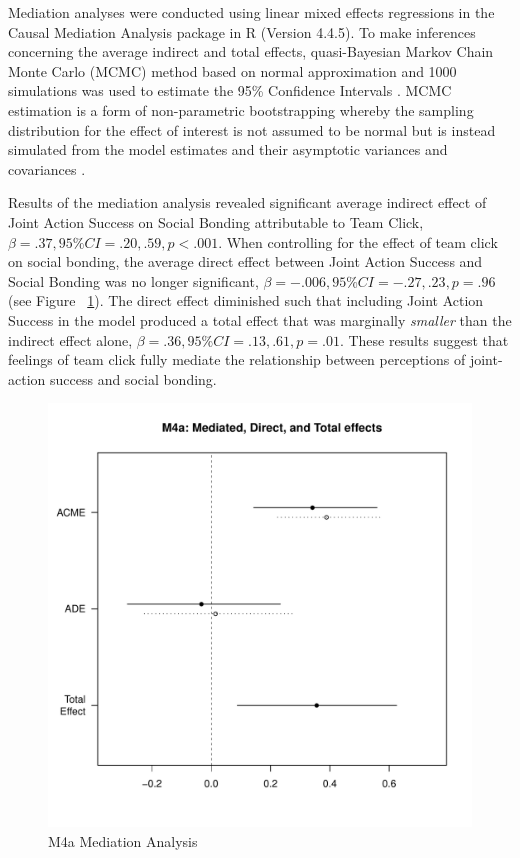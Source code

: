   Mediation analyses were conducted using linear mixed effects regressions in the Causal Mediation Analysis package in R (Version 4.4.5).  To make inferences concerning the average indirect and total effects, quasi-Bayesian Markov Chain Monte Carlo (MCMC) method based on normal approximation and 1000 simulations was used to estimate the 95\% Confidence Intervals \citep{Tofighi2016a,Imai2010}. MCMC estimation is a form of non-parametric bootstrapping whereby the sampling distribution for the effect of interest is not assumed to be normal but is instead simulated from the model estimates and their asymptotic variances and covariances \cite{Preacher2008}.

  Results of the mediation analysis revealed significant average indirect effect of Joint Action Success on Social Bonding attributable to Team Click, $\beta = .37, 95\% CI = .20 , .59, p < .001$.  When controlling for the effect of team click on social bonding, the average direct effect between Joint Action Success and Social Bonding was no longer significant, $\beta = -.006, 95\% CI = -.27 , .23, p = .96 $ (see Figure ~\ref{fig:MLM4aMediationAnalysis}). The direct effect diminished such that including Joint Action Success in the model produced a total effect that was marginally \textit{smaller} than the indirect effect alone, $\beta = .36, 95\% CI = .13 , .61, p = .01$. These results suggest that feelings of team click fully mediate the relationship between perceptions of joint-action success and social bonding.



  \begin{figure}[htbp]
    \centering
    \includegraphics[scale = .5]{images/MLM4aMediationEffects.pdf}
    \caption{M4a Mediation Analysis}
    \label{fig:MLM4aMediationAnalysis}
  \end{figure}

